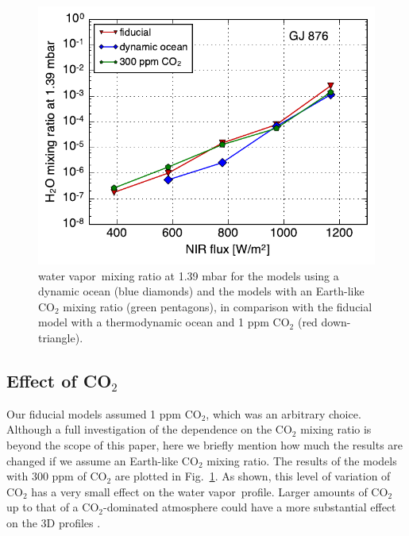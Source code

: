 \documentclass[11pt,numberedappendix,twocolappendix,]{emulateapj}
\newcommand{\wv}{{\color{orange}water vapor\ }}
\begin{document}
\begin{figure}[!h]
    \begin{center}
    \includegraphics[width=0.9\hsize]{fig/xH2O_sensitivity.pdf}
    \end{center}
\caption{\wv mixing ratio at 1.39 mbar for the models using a dynamic ocean (blue diamonds) and the models with an Earth-like CO$_2$ mixing ratio (green pentagons), in comparison with the fiducial model with a thermodynamic ocean and 1 ppm CO$_2$ (red down-triangle). }
\label{fig:change_ocean}
\end{figure}

\subsection{Effect of CO$_2$}
\label{ss:sensitivity_ocean}

Our fiducial models assumed 1 ppm CO$_2$, which was an arbitrary choice. 
Although a full investigation of the dependence on the CO$_2$ mixing ratio is beyond the scope of this paper, here we briefly mention how much the results are changed if we assume an Earth-like CO$_2$ mixing ratio. 
The results of the models with 300 ppm of CO$_2$ are plotted in Fig.~\ref{fig:change_ocean}. 
As shown, this level of variation of CO$_2$ has a very small effect on the \wv profile. 
Larger amounts of CO$_2$ up to that of a CO$_2$-dominated atmosphere could have a more substantial effect on the 3D profiles \citep{Wordsworth2013}. 


\end{document}
